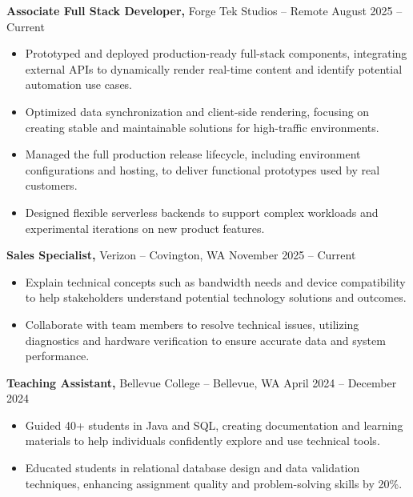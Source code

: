 \documentclass[11pt]{article}       %
\begin{document}
\textbf{Associate Full Stack Developer,} {Forge Tek Studios} -- Remote \hfill August 2025 -- Current 
\vspace{-9pt}
\begin{itemize}
  \item Prototyped and deployed production-ready full-stack components, integrating external APIs to dynamically render real-time content and identify potential automation use cases.
  \item Optimized data synchronization and client-side rendering, focusing on creating stable and maintainable solutions for high-traffic environments.
  \item Managed the full production release lifecycle, including environment configurations and hosting, to deliver functional prototypes used by real customers.
  \item Designed flexible serverless backends to support complex workloads and experimental iterations on new product features.
\end{itemize}

\textbf{Sales Specialist,} {Verizon} -- Covington, WA \hfill November 2025 -- Current \\
\vspace{-9pt}
\begin{itemize}
  \item Explain technical concepts such as bandwidth needs and device compatibility to help stakeholders understand potential technology solutions and outcomes.
  \item Collaborate with team members to resolve technical issues, utilizing diagnostics and hardware verification to ensure accurate data and system performance.
\end{itemize}

\textbf{Teaching Assistant,} {Bellevue College} -- Bellevue, WA \hfill April 2024 -- December 2024 \\
\vspace{-9pt}
\begin{itemize}
  \item Guided 40+ students in Java and SQL, creating documentation and learning materials to help individuals confidently explore and use technical tools.
  \item Educated students in relational database design and data validation techniques, enhancing assignment quality and problem-solving skills by 20\%.
\end{itemize}
\end{document}
